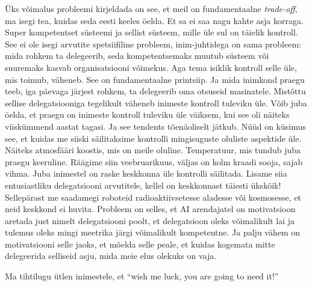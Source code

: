 Üks võimalus probleemi kirjeldada on see, et meil on fundamentaalne 
\emph{trade-off}, ma isegi tea, kuidas seda eesti keeles öelda. Et sa ei saa 
nagu kahte asja korraga. Super kompetentset süsteemi ja sellist süsteem, mille 
üle sul on täielik kontroll. See ei ole isegi arvutite spetsiifiline probleem, 
inim-juhtidega on sama probleem: mida rohkem ta delegeerib, seda 
kompetentsemaks muutub süsteem või suuremaks kasvab organisatsiooni võimekus. 
Aga tema isiklik kontroll selle üle, mis toimub, väheneb. See on fundamentaalne 
printsiip. Ja mida inimkond praegu teeb, iga päevaga järjest rohkem, ta 
delegeerib oma otsuseid masinatele. Mistõttu sellise delegatsiooniga tegelikult 
väheneb inimeste kontroll tuleviku üle. Võib juba öelda, et praegu on inimeste 
kontroll tuleviku üle väiksem, kui see oli näiteks viiskümmend aastat tagasi. 
Ja see tendents tõenäoliselt jätkub. Nüüd on küsimus see, et kuidas me siiski 
säilitaksime kontrolli mingisuguste oluliste aspektide üle. Näiteks atmosfääri 
koostis, mis on meile oluline. Temperatuur, mis tundub juba praegu keeruline. 
Räägime siin veebruarikuus, väljas on kolm kraadi sooja, sajab vihma. Juba 
inimestel on raske keskkonna üle kontrolli säilitada. Lisame siia entusiastliku 
delegatsiooni arvutitele, kellel on keskkonnast täiesti ükskõik! Sellepärast me 
saadamegi roboteid radioaktiivsetesse aladesse või kosmosesse, et neid keskkond 
ei huvita. Probleem on selles, et AI arendajatel on motivatsioon aretada just 
nimelt delegatsiooni poolt, et delegatsioon oleks võimalikult lai ja tulemus 
oleks mingi meetrika järgi võimalikult kompetentne. Ja palju vähem on 
motivatsiooni selle jaoks, et mõelda selle peale, et kuidas kogemata mitte 
delegeerida selliseid asju, mida meie elus olekuks on vaja.


Ma tihtilugu ütlen inimestele, et \enquote{wish me luck, you are going to need 
it!}
